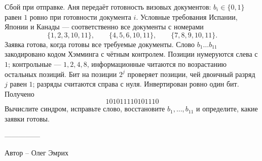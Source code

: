 \question
Сбой при отправке. Аня передаёт готовность визовых документов: $b_i\in\{0,1\}$ равен $1$ ровно при готовности документа $i$. Условные требования Испании, Японии и Канады --- соответственно все документы с номерами
\[
\{1,2,3,10,11\},\qquad \{4,5,6,10,11\},\qquad \{7,8,9,10,11\}.
\]
Заявка готова, когда готовы все требуемые документы. Слово $b_1\ldots b_{11}$ закодировано кодом Хэмминга с чётным контролем. Позиции нумеруются слева с $1$; контрольные --- $1,2,4,8$, информационные читаются по возрастанию остальных позиций. Бит на позиции $2^j$ проверяет позиции, чей двоичный разряд $j$ равен $1$; разряды считаются справа с нуля. Инвертирован ровно один бит. Получено
\[
101011110101110
\]
Вычислите синдром, исправьте слово, восстановите $b_1,\ldots,b_{11}$ и определите, какие заявки готовы.

---------------

Автор -- Олег Эмрих
